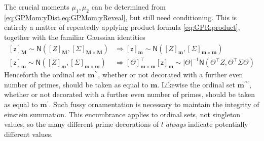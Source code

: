 \documentclass[preprint,12pt]{elsarticle}
\newcommand*{\M}[1]{\ensuremath{#1}\xspace}
\newcommand*{\x}{\times}
\newcommand*{\mi}[1]{\mathbf{#1}}
\newcommand*{\rv}[1]{\mathsf{#1}}
\newcommand*{\te}[2][]{\left\lbrack{#2}\right\rbrack_{#1}}
\newcommand*{\gauss}[2]{\mathsf{N}\!\left({#1,#2}\right)}
\newcommand*{\modulus}[1]{\M{\left\lvert{#1}\right\rvert}}
\begin{document}
    The crucial moments $\mu_{1},\mu_{2}$ can be determined from \cref{eq:GPMom:yDist,eq:GPMom:yReveal}, but still need conditioning. This is entirely a matter of repeatedly applying product formula \cref{eq:GPR:product}, together with the familiar Gaussian identities
    \begin{equation*}
        \begin{aligned}
            \te[\mi{M}]{\rv{z}} \sim \gauss{\te[\mi{M}]{Z}}{\te[\mi{M}\x\mi{M}]{\Sigma}} &\Rightarrow
            \te[\mi{m}]{\rv{z}} \sim \gauss{\te[\mi{m}]{Z}}{\te[\mi{m}\x\mi{m}]{\Sigma}} \\
            \te[\mi{m}]{\rv{z}} \sim \gauss{\te[\mi{m}]{Z}}{\te[\mi{m}\x\mi{m}]{\Sigma}} &\Rightarrow
            \te[\mi{m}\x\mi{m}]{\Theta}^{\intercal}\te[\mi{m}]{\rv{z}} \sim 
            \modulus{\Theta}^{-1}
            \gauss{\Theta^{\intercal}Z}{\Theta^{\intercal}\Sigma\Theta}                        
        \end{aligned}
    \end{equation*}
    Henceforth the ordinal set $\mi{m^{\prime\prime}}$, whether or not decorated with a further even number of primes, should be taken as equal to $\mi{m}$. 
    Likewise the ordinal set $\mi{m^{\prime\prime\prime}}$, whether or not decorated with a further even number of primes, should be taken as equal to $\mi{m^{\prime}}$. Such fussy ornamentation is necessary to maintain the integrity of einstein summation. This encumbrance applies to ordinal sets, not singleton values, so the many different prime decorations of $l$ \emph{always} indicate potentially different values.
\end{document}
